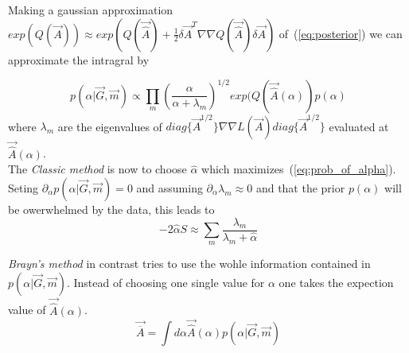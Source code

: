 \noindent Making a gaussian approximation $exp(Q(\vec{A})) \approx exp(Q(\vec{\hat{A}}) + \frac{1}{2} \delta \vec{A}^T \nabla \nabla Q(\vec{\hat{A}}) \delta \vec{A})$
of~(\ref{eq:posterior}) we can approximate the intragral by 

\begin{equation}\label{eq:prob_of_alpha}
 p(\alpha|\vec{G},\vec{m}) \propto  \prod_m  \left( \frac{\alpha}{\alpha + \lambda_m} \right)^{1/2}  exp(Q(\vec{\hat{A}}(\alpha))p(\alpha)
\end{equation}
where $\lambda_m$ are the eigenvalues of $diag\{ \vec{A}^{1/2}\} \nabla \nabla L(\vec{A}) diag\{\vec{A}^{1/2}\} $ 
evaluated at $\vec{\hat{A}}(\alpha)$.
\\
\noindent The \textit{Classic method} is now to choose $\hat{\alpha}$ which maximizes~(\ref{eq:prob_of_alpha}). Seting 
$\partial_{\alpha}p(\alpha|\vec{G},\vec{m}) = 0$ and assuming $\partial_{\alpha}\lambda_m \approx 0$ and that the prior
$p(\alpha)$ will be owerwhelmed by the data, this leads to 
\begin{equation}\label{eq:classic_method_constraint}
 -2\hat{\alpha}S \approx \sum_m \frac{\lambda_m}{\lambda_m +\hat{\alpha}} 
\end{equation}

\noindent \textit{Brayn's method} in contrast tries to use the wohle information contained in $p(\alpha|\vec{G},\vec{m})$. 
Instead of choosing one single value for $\alpha$ one takes the expection value of $\vec{\hat{A}}(\alpha)$.
\begin{equation}\label{eq:brayn_method_constraint}
 \vec{\overline{A}} = \int d\alpha \vec{\hat{A}}(\alpha) p(\alpha|\vec{G},\vec{m})
\end{equation}

